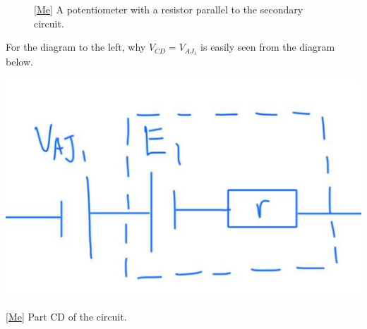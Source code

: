 \begin{itemize}
\begin{itemize}
\begin{figure}[H]
\begin{subfigure}{0.45\textwidth}
            \end{subfigure}
            \caption{\ref{Me} A potentiometer with a resistor parallel to the secondary circuit.}
            \label{fig:potentiometer-parallel-resistor}
        \end{figure}
        For the diagram to the left, why \(V_{CD}=V_{AJ_1}\) is easily seen from the diagram below.
        \begin{center}
            \includegraphics[width=0.3\columnwidth]{../images/D.C.-Voltage-Cancelling-Each-Other.png}
            \captionsetup{type=figure}
            \caption[figure]{\ref{Me} Part CD of the circuit.}
        \end{center}
    \end{itemize}
\end{itemize}